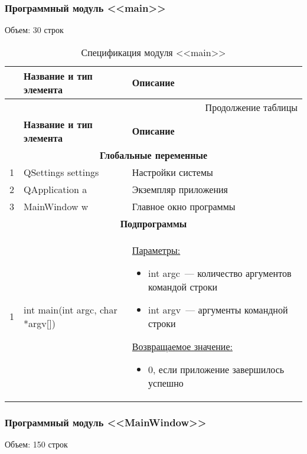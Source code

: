\renewcommand{\thesubsubsection}{\Asbuk{appendix}.\arabic{subsubsection}}
\setcounter{subsection}{0}
\subsubsection*{Программный модуль <<main>>}
Объем: 30 строк

\small
\singlespacing
\begin{longtable}[h]{|p{}|p{}|p{}|}
  \caption{Спецификация модуля <<main>>}
	\\ \hline
	  \textbf{\No}                  &
	  \textbf{Название и тип элемента}  &
	  \textbf{Описание}
	\\ \hline
  \endfirsthead

  \multicolumn{3}{r}{Продолжение таблицы \thetable{}}
  \\ \hline
	  \textbf{\No}                  &
	  \textbf{Название и тип элемента}  &
	  \textbf{Описание}
	\\ \hline
  \endhead

  \multicolumn{3}{|c|}{\textbf{Глобальные переменные}} \\
  \hline
  1 & QSettings settings & Настройки системы \\ \hline
  2 & QApplication a & Экземпляр приложения \\ \hline
  3 & MainWindow w & Главное окно программы \\ \hline

  \multicolumn{3}{|c|}{\textbf{Подпрограммы}} \\
  \hline
  1 & int main(int argc, char *argv[]) &
    \uline{Параметры:}
    \begin{itemize}[nolistsep,label=,leftmargin=0cm]
      \item int argc~--- количество аргументов командой строки
      \item int argv~--- аргументы командной строки
    \end{itemize}
    \uline{Возвращаемое значение:}
    \begin{itemize}[nolistsep,label=,leftmargin=0cm]
      \item 0, если приложение завершилось успешно
    \end{itemize}
  \\ \hline
\end{longtable}
\normalsize
\onehalfspacing


\subsubsection*{Программный модуль <<MainWindow>>}
Объем: 150 строк

